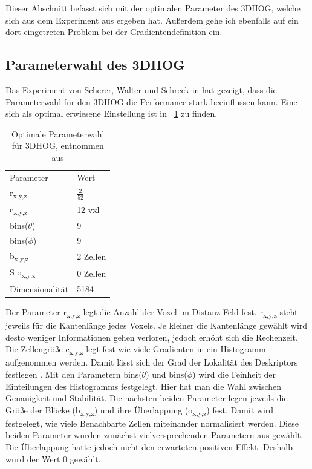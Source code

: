 Dieser Abschnitt befasst sich mit der optimalen Parameter des 3DHOG, welche sich aus dem Experiment aus \cite{scherer2010histograms} ergeben hat. Außerdem gehe ich ebenfalls auf ein dort eingetreten Problem bei der Gradientendefinition ein.
\subsection{Parameterwahl des 3DHOG}
Das Experiment von Scherer, Walter und Schreck in \cite{scherer2010histograms} hat gezeigt, dass die Parameterwahl für den 3DHOG die Performance stark beeinflussen kann. Eine sich als optimal erwiesene Einstellung ist in \figurename~\ref{Parameter} zu finden.

\begin{table}[H]
	\centering
	\caption{Optimale Parameterwahl für 3DHOG, entnommen aus \cite{scherer2010histograms}}
	\label{Parameter}
	\begin{tabular}{ll}
		Parameter                & Wert     \\
		r\textsubscript{x,y,z} & $\frac{2}{52}$    \\
		c\textsubscript{x,y,z} & 12 vxl   \\
		bins($ \theta $)       & 9        \\
		bins($ \phi $)         & 9        \\
		b\textsubscript{x,y,z} & 2 Zellen \\S
		o\textsubscript{x,y,z} & 0 Zellen \\
		Dimensionalität          & 5184    
	\end{tabular}
	
\end{table}
Der Parameter r\textsubscript{x,y,z} legt die Anzahl der Voxel im Distanz Feld fest. r\textsubscript{x,y,z} steht jeweils für die Kantenlänge jedes Voxels. Je kleiner die Kantenlänge gewählt wird desto weniger Informationen gehen verloren, jedoch erhöht sich die Rechenzeit. Die Zellengröße c\textsubscript{x,y,z} legt fest wie viele Gradienten in ein Histogramm aufgenommen werden. Damit lässt sich der Grad der Lokalität des Deskriptors festlegen \cite{scherer2010histograms}.
Mit den Parametern 	bins($ \theta $) und bins($ \phi $) wird die Feinheit der Einteilungen des Histogramms festgelegt. Hier hat man die Wahl zwischen Genauigkeit und Stabilität.
Die nächsten beiden Parameter legen jeweils die Größe der Blöcke (b\textsubscript{x,y,z})  und ihre Überlappung  (o\textsubscript{x,y,z}) fest. Damit wird festgelegt, wie viele Benachbarte Zellen miteinander normalisiert werden. Diese beiden Parameter wurden zunächst vielversprechenden Parametern aus \cite{dalal2005histograms} gewählt. Die Überlappung hatte jedoch nicht den erwarteten positiven Effekt. Deshalb wurd der Wert 0 gewählt.



